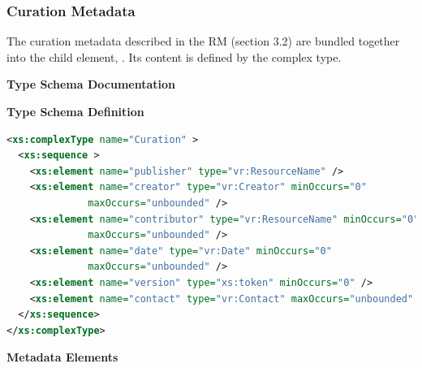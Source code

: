 \documentclass[11pt,a4paper]{ivoa}
\begin{document}
\subsubsection{Curation Metadata}


The curation metadata described in the RM (section
3.2) are bundled together into the  child element,
.  Its content is defined by the
 complex type.



\begingroup
      	\renewcommand*\descriptionlabel[1]{%
      	\hbox to 5.5em{\emph{#1}\hfil}}\vspace{2ex}\noindent\textbf{ Type Schema Documentation}


\vspace{1ex}\noindent\textbf{ Type Schema Definition}

\begin{lstlisting}[language=XML,basicstyle=\footnotesize]
<xs:complexType name="Curation" >
  <xs:sequence >
    <xs:element name="publisher" type="vr:ResourceName" />
    <xs:element name="creator" type="vr:Creator" minOccurs="0"
              maxOccurs="unbounded" />
    <xs:element name="contributor" type="vr:ResourceName" minOccurs="0"
              maxOccurs="unbounded" />
    <xs:element name="date" type="vr:Date" minOccurs="0"
              maxOccurs="unbounded" />
    <xs:element name="version" type="xs:token" minOccurs="0" />
    <xs:element name="contact" type="vr:Contact" maxOccurs="unbounded" />
  </xs:sequence>
</xs:complexType>
\end{lstlisting}

\vspace{0.5ex}\noindent\textbf{ Metadata Elements}
\end{document}
